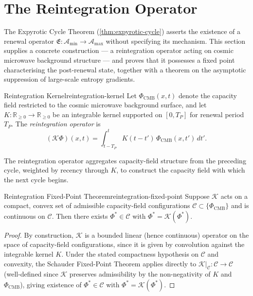 \documentclass[12pt,twoside,openright]{book}
\begin{document}
\section{The Reintegration Operator}
\label{sec:ch18-reintegration}

The Expyrotic Cycle Theorem (\cref{thm:expyrotic-cycle})
asserts the existence of a renewal operator
$\mathfrak{E}:\mathcal{A}_{\min}\to\mathcal{A}_{\max}$
without specifying its mechanism. This section supplies a
concrete construction --- a reintegration operator acting
on cosmic microwave background structure --- and proves that
it possesses a fixed point characterising the
post-renewal state, together with a theorem on the
asymptotic suppression of large-scale entropy gradients.

\begin{definition}{Reintegration Kernel}{reintegration-kernel}
  Let $\Phi_\mathrm{CMB}(x,t)$ denote the capacity field
  restricted to the cosmic microwave background surface, and
  let $K:\mathbb{R}_{\ge0}\to\mathbb{R}_{\ge0}$ be an
  integrable kernel supported on $[0,T_P]$ for renewal
  period $T_P$. The \emph{reintegration operator} is
  \[
    (\mathcal{K}\Phi)(x,t)
    = \int_{t-T_P}^{t} K(t-t')\, \Phi_\mathrm{CMB}(x,t')\, dt'.
  \]
\end{definition}

The reintegration operator aggregates capacity-field
structure from the preceding cycle, weighted by recency
through $K$, to construct the capacity field with which the
next cycle begins.

\begin{theorem}{Reintegration Fixed-Point Theorem}{reintegration-fixed-point}
  Suppose $\mathcal{K}$ acts on a compact, convex set of
  admissible capacity-field configurations
  $\mathcal{C} \subset \{\Phi_\mathrm{CMB}\}$ and is
  continuous on $\mathcal{C}$. Then there exists
  $\Phi^*\in\mathcal{C}$ with $\Phi^* = \mathcal{K}(\Phi^*)$.
\end{theorem}

\begin{proof}
  By construction, $\mathcal{K}$ is a bounded linear
  (hence continuous) operator on the space of capacity-field
  configurations, since it is given by convolution against
  the integrable kernel $K$. Under the stated compactness
  hypothesis on $\mathcal{C}$ and convexity, the
  Schauder Fixed-Point Theorem applies directly to
  $\mathcal{K}|_\mathcal{C} : \mathcal{C}\to\mathcal{C}$
  (well-defined since $\mathcal{K}$ preserves admissibility
  by the non-negativity of $K$ and $\Phi_\mathrm{CMB}$),
  giving existence of $\Phi^*\in\mathcal{C}$ with
  $\Phi^* = \mathcal{K}(\Phi^*)$.
\end{proof}
\end{document}
